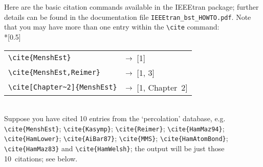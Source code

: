 Here are the basic citation commands available in the IEEEtran package; further details can be found in the documentation file \verb"IEEEtran_bst_HOWTO.pdf". Note that you may have more than one entry within the \verb"\cite" command:\\*[0.5\baselineskip]
\begin{tabular}{@{}ll@{}}
\verb"\cite{MenshEst}"
    & $\rightarrow\enskip$[1]\\
\verb"\cite{MenshEst,Reimer}"
    & $\rightarrow\enskip$[1, 3]\\
\verb"\cite[Chapter~2]{MenshEst}"
    & $\rightarrow\enskip$[1, Chapter~2]\\
\end{tabular}\\[0.5\baselineskip]
%
\noindent Suppose you have cited 10 entries from the `percolation' database, e.g. \verb"\cite{MenshEst}"; \verb"\cite{Kasymp}"; \verb"\cite{Reimer}"; \verb"\cite{HamMaz94}"; \verb"\cite{HamLower}"; \verb"\cite{AiBar87}"; \verb"\cite{MMS}"; \verb"\cite{HamAtomBond}";  \verb"\cite{HamMaz83}" and \verb"\cite{HamWelsh}"; the output will be just those 10~citations; see below.

